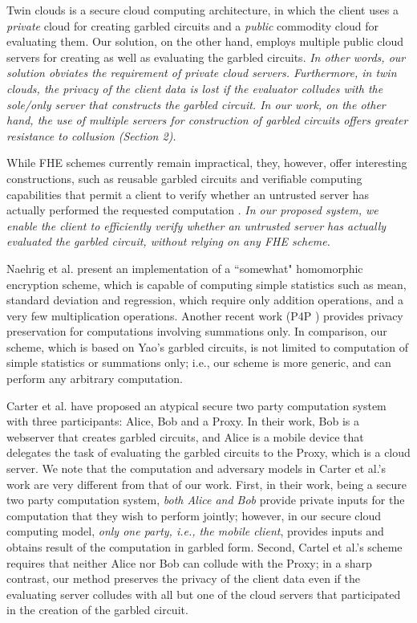 \documentclass[10pt,journal,cspaper,compsoc]{IEEEtran}
\begin{document}
Twin clouds \cite{bugiel11} is a secure cloud computing architecture, in which the client uses a {\em private} cloud for creating garbled circuits and a {\em public} commodity cloud for evaluating them.
Our solution, on the other hand, employs multiple public cloud servers for creating as well as evaluating the garbled circuits. {\em In other words, our solution obviates the requirement of private cloud servers. Furthermore, in twin clouds, the privacy of the client data is lost if the evaluator colludes with the sole/only server that constructs the garbled circuit. In our work, on the other hand, the use of multiple servers for construction of garbled circuits offers greater resistance to collusion (Section 2).}


While FHE schemes currently remain impractical, they, however, offer interesting constructions, such as reusable garbled circuits \cite{goldwasser13} and verifiable computing capabilities that permit a client to verify whether an untrusted server has actually performed the requested computation \cite{gennaro10}. {\em In our proposed system, we enable the client to efficiently verify whether an untrusted server has actually evaluated the garbled circuit, without relying on any FHE scheme.}


Naehrig et al. \cite{naehrig11} present an implementation of a ``somewhat" homomorphic encryption scheme, which is capable of computing simple statistics such as mean, standard deviation and regression, which require only addition operations, and a very few multiplication operations. Another recent work (P4P \cite{duan10}) provides privacy preservation for computations involving summations only. In comparison, our scheme, which is based on Yao's garbled circuits, is not limited to computation of simple statistics or summations only; i.e., our scheme is more generic, and can perform any arbitrary computation.


Carter et al. \cite{carter13} have proposed an atypical secure two party computation system with three participants: Alice, Bob and a Proxy. In their work, Bob is a webserver that creates garbled circuits, and Alice is a mobile device that delegates the task of evaluating the garbled circuits to the Proxy, which is a cloud server. We note that the computation and adversary models in Carter et al.'s work are very different from that of our work. First, in their work, being a secure two party computation system, {\em both Alice and Bob} provide private inputs for the computation that they wish to perform jointly; however, in our secure cloud computing model, {\em only one party, i.e., the mobile client}, provides inputs and obtains result of the computation in garbled form. Second, Cartel et al.'s scheme requires that neither Alice nor Bob can collude with the Proxy; in a sharp contrast, our method preserves the privacy of the client data even if the evaluating server colludes with all but one of the cloud servers that participated in the creation of the garbled circuit. 
\end{document}
